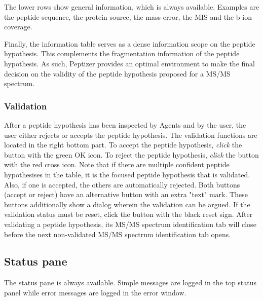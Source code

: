\npar The lower rows show general information, which is always available. Examples are the peptide sequence, the protein source, the mass error, the MIS and the b-ion coverage.
%
\begin{center}
\end{center}
%
\npar Finally, the information table serves as a dense information scope on the peptide hypothesis. This complements the fragmentation information of the peptide hypothesis. As such, Peptizer provides an optimal environment to make the final decision on the validity of the peptide hypothesis proposed for a MS/MS spectrum.
\subsubsection{Validation}
\npar After a peptide hypothesis has been inspected by Agents and by the user, the user either rejects or accepts the peptide hypothesis.
\npar The validation functions are located in the right bottom part. To accept the peptide hypothesis, \textit{click }the button with the green OK icon. To reject the peptide hypothesis, \textit{click} the button with the red cross icon. Note that if there are multiple confident peptide hypothesises in the table, it is the focused peptide hypothesis that is validated. Also, if one is accepted, the others are automatically rejected. Both buttons (accept or reject) have an alternative button with an extra "text" mark. These buttons additionally show a dialog wherein the validation can be argued. If the validation status must be reset, click the button with the black reset sign. After validating a peptide hypothesis, its MS/MS spectrum identification tab will close before the next non-validated MS/MS spectrum identification tab opens.
\subsection{Status pane}
\npar The status pane is always available. Simple messages are logged in the top status panel while error messages are logged in the error window. 
%
%
